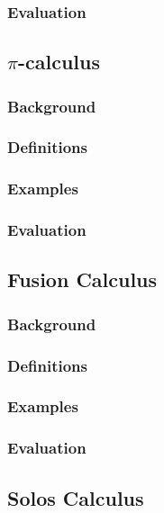 \documentclass{article}
\begin{document}
        \subsubsection{Evaluation}


    \subsection{$\pi$-calculus}
        \subsubsection{Background}
            \cite{pi-calculus}

        \subsubsection{Definitions}

        \subsubsection{Examples}

        \subsubsection{Evaluation}


    \subsection{Fusion Calculus}
        \subsubsection{Background}
            \cite{fusion-calculus}

        \subsubsection{Definitions}

        \subsubsection{Examples}

        \subsubsection{Evaluation}


    \subsection{Solos Calculus}
\end{document}
